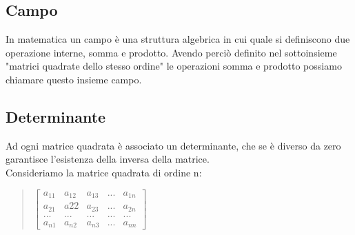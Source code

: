 \documentclass[a4paper]{article}
\begin{document}
\begin{itemize}
\begin{quote}
$
\bigskip \\
$\left[\begin{matrix}1/a & 0 & \\ 0& 1/d\end{matrix}\right]
* \left[\begin{matrix}a & b & \\ c & d\end{matrix}\right]
=\left[\begin{matrix}1&0 \\ 0&1 \end{matrix}\right]
$\end{quote}
\end{itemize}

\subsection{Campo}
In matematica un campo è una struttura algebrica in cui quale si definiscono due operazione interne, somma e prodotto. Avendo perciò definito nel sottoinsieme "matrici quadrate dello stesso ordine" le operazioni somma e prodotto possiamo chiamare questo insieme campo.

\subsection{Determinante}
Ad ogni matrice quadrata è associato un determinante, che se è diverso da zero garantisce l’esistenza della inversa della matrice.
\\ Consideriamo la matrice quadrata di ordine n:
\\
\begin{quote} \centering
$\left[\begin{matrix}a_{11} & a_{12} & a_{13} & ... & a_{1n} \\ a_{21} & a{22} & a_{23} & ... & a_{2n} \\ ... & ... & ... & ... & ...\\ a_{n1} & a_{n2} & a_{n3} & ... & a_{nn}\end{matrix}\right]
$ \end{quote}
\end{document}
